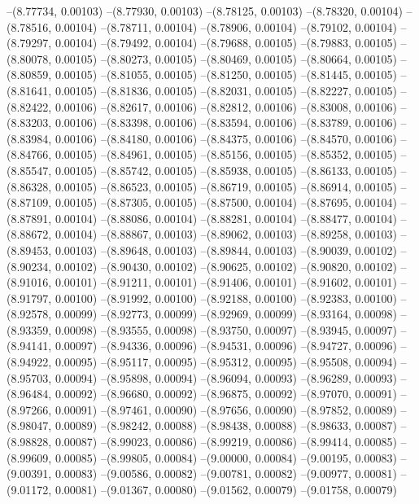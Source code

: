 --(8.77734, 0.00103)
--(8.77930, 0.00103)
--(8.78125, 0.00103)
--(8.78320, 0.00104)
--(8.78516, 0.00104)
--(8.78711, 0.00104)
--(8.78906, 0.00104)
--(8.79102, 0.00104)
--(8.79297, 0.00104)
--(8.79492, 0.00104)
--(8.79688, 0.00105)
--(8.79883, 0.00105)
--(8.80078, 0.00105)
--(8.80273, 0.00105)
--(8.80469, 0.00105)
--(8.80664, 0.00105)
--(8.80859, 0.00105)
--(8.81055, 0.00105)
--(8.81250, 0.00105)
--(8.81445, 0.00105)
--(8.81641, 0.00105)
--(8.81836, 0.00105)
--(8.82031, 0.00105)
--(8.82227, 0.00105)
--(8.82422, 0.00106)
--(8.82617, 0.00106)
--(8.82812, 0.00106)
--(8.83008, 0.00106)
--(8.83203, 0.00106)
--(8.83398, 0.00106)
--(8.83594, 0.00106)
--(8.83789, 0.00106)
--(8.83984, 0.00106)
--(8.84180, 0.00106)
--(8.84375, 0.00106)
--(8.84570, 0.00106)
--(8.84766, 0.00105)
--(8.84961, 0.00105)
--(8.85156, 0.00105)
--(8.85352, 0.00105)
--(8.85547, 0.00105)
--(8.85742, 0.00105)
--(8.85938, 0.00105)
--(8.86133, 0.00105)
--(8.86328, 0.00105)
--(8.86523, 0.00105)
--(8.86719, 0.00105)
--(8.86914, 0.00105)
--(8.87109, 0.00105)
--(8.87305, 0.00105)
--(8.87500, 0.00104)
--(8.87695, 0.00104)
--(8.87891, 0.00104)
--(8.88086, 0.00104)
--(8.88281, 0.00104)
--(8.88477, 0.00104)
--(8.88672, 0.00104)
--(8.88867, 0.00103)
--(8.89062, 0.00103)
--(8.89258, 0.00103)
--(8.89453, 0.00103)
--(8.89648, 0.00103)
--(8.89844, 0.00103)
--(8.90039, 0.00102)
--(8.90234, 0.00102)
--(8.90430, 0.00102)
--(8.90625, 0.00102)
--(8.90820, 0.00102)
--(8.91016, 0.00101)
--(8.91211, 0.00101)
--(8.91406, 0.00101)
--(8.91602, 0.00101)
--(8.91797, 0.00100)
--(8.91992, 0.00100)
--(8.92188, 0.00100)
--(8.92383, 0.00100)
--(8.92578, 0.00099)
--(8.92773, 0.00099)
--(8.92969, 0.00099)
--(8.93164, 0.00098)
--(8.93359, 0.00098)
--(8.93555, 0.00098)
--(8.93750, 0.00097)
--(8.93945, 0.00097)
--(8.94141, 0.00097)
--(8.94336, 0.00096)
--(8.94531, 0.00096)
--(8.94727, 0.00096)
--(8.94922, 0.00095)
--(8.95117, 0.00095)
--(8.95312, 0.00095)
--(8.95508, 0.00094)
--(8.95703, 0.00094)
--(8.95898, 0.00094)
--(8.96094, 0.00093)
--(8.96289, 0.00093)
--(8.96484, 0.00092)
--(8.96680, 0.00092)
--(8.96875, 0.00092)
--(8.97070, 0.00091)
--(8.97266, 0.00091)
--(8.97461, 0.00090)
--(8.97656, 0.00090)
--(8.97852, 0.00089)
--(8.98047, 0.00089)
--(8.98242, 0.00088)
--(8.98438, 0.00088)
--(8.98633, 0.00087)
--(8.98828, 0.00087)
--(8.99023, 0.00086)
--(8.99219, 0.00086)
--(8.99414, 0.00085)
--(8.99609, 0.00085)
--(8.99805, 0.00084)
--(9.00000, 0.00084)
--(9.00195, 0.00083)
--(9.00391, 0.00083)
--(9.00586, 0.00082)
--(9.00781, 0.00082)
--(9.00977, 0.00081)
--(9.01172, 0.00081)
--(9.01367, 0.00080)
--(9.01562, 0.00079)
--(9.01758, 0.00079)
